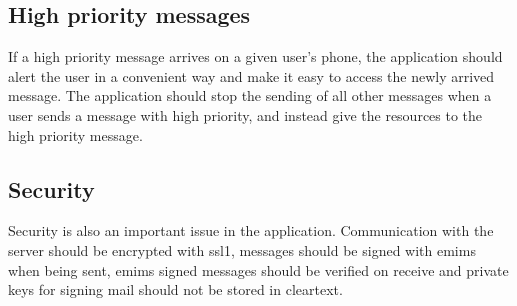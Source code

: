 \subsection{High priority messages}
If a high priority message arrives on a given user’s phone, the application should alert the user in a convenient way and make it easy to access the newly arrived message. The application should stop the sending of all other messages when a user sends a message with high priority, and instead give the resources to the high priority message.  

\subsection{Security}
Security is also an important issue in the application. Communication with the server should be encrypted with \gls{ssl1}, messages should be signed with \gls{emims} when being sent, \gls{emims} signed messages should be verified on receive and private keys for
signing mail should not be stored in cleartext.

